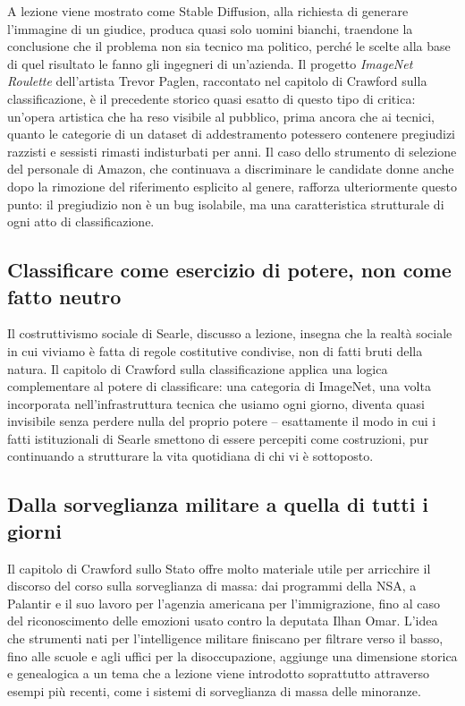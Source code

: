 \documentclass[a4paper,11pt]{article}
\begin{document}
A lezione viene mostrato come Stable Diffusion, alla richiesta di generare l'immagine di un giudice, produca quasi solo uomini bianchi, traendone la conclusione che il problema non sia tecnico ma politico, perché le scelte alla base di quel risultato le fanno gli ingegneri di un'azienda. Il progetto \emph{ImageNet Roulette} dell'artista Trevor Paglen, raccontato nel capitolo di Crawford sulla classificazione, è il precedente storico quasi esatto di questo tipo di critica: un'opera artistica che ha reso visibile al pubblico, prima ancora che ai tecnici, quanto le categorie di un dataset di addestramento potessero contenere pregiudizi razzisti e sessisti rimasti indisturbati per anni. Il caso dello strumento di selezione del personale di Amazon, che continuava a discriminare le candidate donne anche dopo la rimozione del riferimento esplicito al genere, rafforza ulteriormente questo punto: il pregiudizio non è un bug isolabile, ma una caratteristica strutturale di ogni atto di classificazione.

\subsection{Classificare come esercizio di potere, non come fatto neutro}

Il costruttivismo sociale di Searle, discusso a lezione, insegna che la realtà sociale in cui viviamo è fatta di regole costitutive condivise, non di fatti bruti della natura. Il capitolo di Crawford sulla classificazione applica una logica complementare al potere di classificare: una categoria di ImageNet, una volta incorporata nell'infrastruttura tecnica che usiamo ogni giorno, diventa quasi invisibile senza perdere nulla del proprio potere -- esattamente il modo in cui i fatti istituzionali di Searle smettono di essere percepiti come costruzioni, pur continuando a strutturare la vita quotidiana di chi vi è sottoposto.

\subsection{Dalla sorveglianza militare a quella di tutti i giorni}

Il capitolo di Crawford sullo Stato offre molto materiale utile per arricchire il discorso del corso sulla sorveglianza di massa: dai programmi della NSA, a Palantir e il suo lavoro per l'agenzia americana per l'immigrazione, fino al caso del riconoscimento delle emozioni usato contro la deputata Ilhan Omar. L'idea che strumenti nati per l'intelligence militare finiscano per filtrare verso il basso, fino alle scuole e agli uffici per la disoccupazione, aggiunge una dimensione storica e genealogica a un tema che a lezione viene introdotto soprattutto attraverso esempi più recenti, come i sistemi di sorveglianza di massa delle minoranze.
\end{document}
